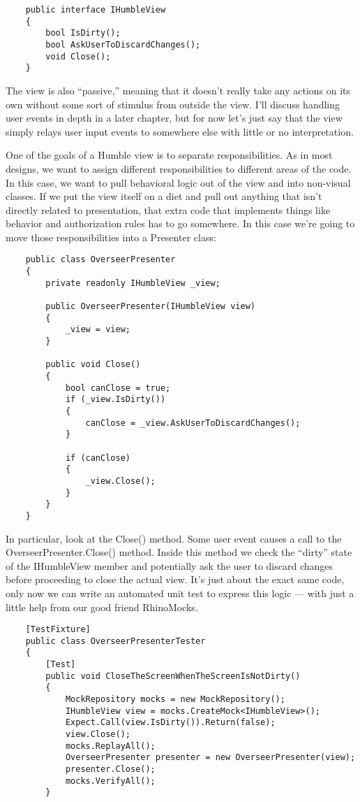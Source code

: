 \documentclass{article}
\begin{document}
{\begin{lstlisting}
    public interface IHumbleView
    {
        bool IsDirty();
        bool AskUserToDiscardChanges();
        void Close();
    }
\end{lstlisting}	

The view is also “passive,” meaning that it doesn't really take any actions on its own without some sort of stimulus from outside the view.  I'll discuss handling user events in depth in a later chapter, but for now let's just say that the view simply relays user input events to somewhere else with little or no interpretation. 

One of the goals of a Humble view is to separate responsibilities.  As in most designs, we want to assign different responsibilities to different areas of the code.  In this case, we want to pull behavioral logic out of the view and into non-visual classes.  If we put the view itself on a diet and pull out anything that isn't directly related to presentation, that extra code that implements things like behavior and authorization rules has to go somewhere.  In this case we're going to move those responsibilities into a Presenter class:
\newpage
\begin{lstlisting}
    public class OverseerPresenter
    {
        private readonly IHumbleView _view;
		
        public OverseerPresenter(IHumbleView view)
        {
            _view = view;
        }

        public void Close()
        {
            bool canClose = true;
            if (_view.IsDirty())
            {
                canClose = _view.AskUserToDiscardChanges();
            }

            if (canClose)
            {
                _view.Close();
            }
        }
    }
\end{lstlisting}	
\newpage
In particular, look at the Close() method.  Some user event causes a call to the OverseerPresenter.Close() method.  Inside this method we check the “dirty” state of the IHumbleView member and potentially ask the user to discard changes before proceeding to close the actual view.  It's just about the exact same code, only now we can write an automated unit test to express this logic — with just a little help from our good friend RhinoMocks.

\begin{lstlisting}
    [TestFixture]
    public class OverseerPresenterTester
    {
        [Test]
        public void CloseTheScreenWhenTheScreenIsNotDirty()
        {
            MockRepository mocks = new MockRepository();
            IHumbleView view = mocks.CreateMock<IHumbleView>();
            Expect.Call(view.IsDirty()).Return(false);
            view.Close();
            mocks.ReplayAll();
            OverseerPresenter presenter = new OverseerPresenter(view);
            presenter.Close();
            mocks.VerifyAll();
        }


\end{lstlisting}}
\end{document}
